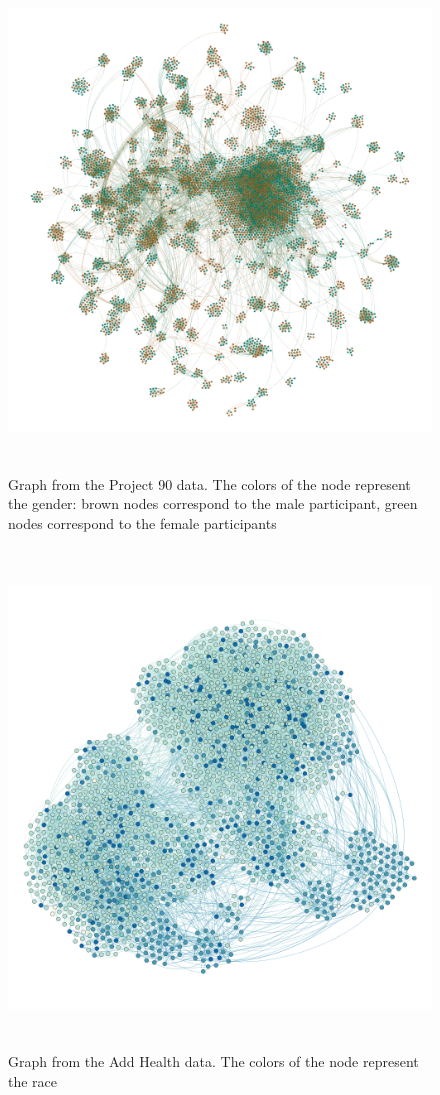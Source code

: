\documentclass[12pt]{report}
\begin{document}
\begin{figure}[ht]
    \centering
    \includegraphics[height=500px]{project90gender}
    \caption{Graph from the Project 90 data. The colors of the node represent the gender: brown nodes correspond to the male participant, green nodes correspond to the female participants}
    \label{fig:project90gender}
\end{figure}

\begin{figure}[ht]
    \centering
    \includegraphics[height=500px]{addhealthRace}
    \caption{Graph from the Add Health data. The colors of the node represent the race}
    \label{fig:addhealthRace}
\end{figure}
\end{document}
